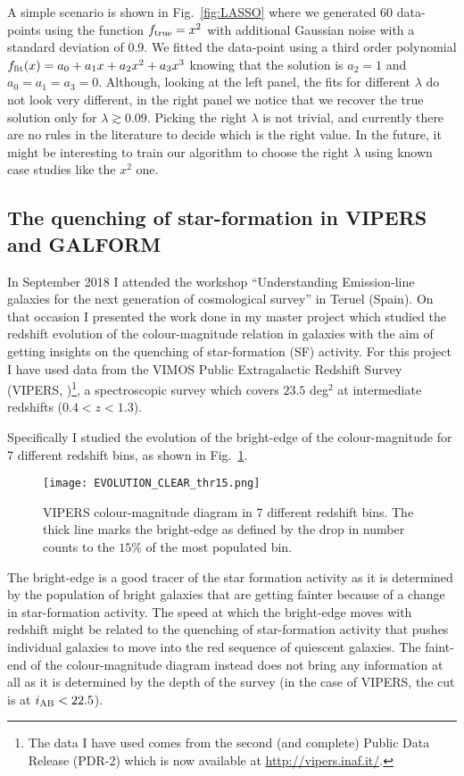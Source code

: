 \documentclass[11pt]{article}
\begin{document}
 A simple scenario is shown in Fig.~\ref{fig:LASSO} where we generated 60 data-points using the function $f_{\rm{true}} = x^2$ with additional Gaussian noise with a standard deviation of 0.9. We fitted the data-point using a third order polynomial $f_{\rm{fit}}(x)=a_0 + a_1x  + a_2x^2 + a_3 x^3$ knowing that the solution is $a_2=1$ and $a_0=a_1=a_3=0$. Although, looking at the left panel, the fits for different $\lambda$ do not look very different, in the right panel we notice that we recover the true solution only for $\lambda \gtrsim 0.09$. Picking the right $\lambda$ is not trivial, and currently there are no rules in the literature to decide which is the right value. In the future, it might be interesting to train our algorithm to choose the right $\lambda$ using known case studies like the $x^2$ one.

\subsection{The quenching of star-formation in VIPERS and GALFORM}
\label{sub:vipers}

In September 2018 I attended the workshop ``Understanding Emission-line galaxies for the next generation of cosmological survey'' in Teruel (Spain). 
On that occasion I presented the work done in my master project which studied the redshift evolution of the colour-magnitude relation in galaxies with the aim of getting insights on the quenching of star-formation (SF) activity. For this project I have used data from the VIMOS Public Extragalactic Redshift Survey (VIPERS, \citealt{guzzo14,scodeggio16})\footnote{The data I have used comes from the second (and complete) Public Data Release (PDR-2) which is now available at \url{http://vipers.inaf.it/}. }, a spectroscopic survey which covers $23.5$ deg$^2$ at intermediate redshifts ($0.4<z<1.3$).

 Specifically I studied the evolution of the bright-edge of the colour-magnitude for 7 different redshift bins, as shown in Fig.~\ref{fig:vipers}. 
\begin{figure}
\centering
\texttt{[image: EVOLUTION\_CLEAR\_thr15.png]}
\caption{VIPERS colour-magnitude diagram in 7 different redshift bins. The thick line marks the bright-edge as defined by the drop in number counts to the $15\%$ of the most populated bin.}
\label{fig:vipers}
\end{figure}
 The bright-edge is a good tracer of the star formation activity as it is determined by the population of bright galaxies that are getting fainter because of a change in star-formation activity. The speed at which the bright-edge moves with redshift might be related to the quenching of star-formation activity that pushes individual galaxies to move into the red sequence of quiescent galaxies. The faint-end of the colour-magnitude diagram instead does not bring any information at all as it is determined by the depth of the survey (in the case of VIPERS, the cut is at $i_{\rm{AB}}<22.5$). 
\end{document}
